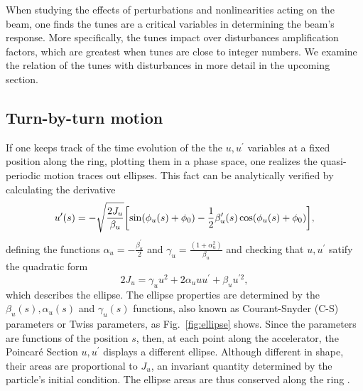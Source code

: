 When studying the effects of perturbations and nonlinearities acting on the beam, one finds the tunes are a critical variables in determining the beam's response. More specifically, the tunes impact over disturbances amplification factors, which are greatest when tunes are close to integer numbers. We examine the relation of the tunes with disturbances in more detail in the upcoming section.

\subsection{Turn-by-turn motion}
If one keeps track of the time evolution of the the $u, u^\prime$ variables at a fixed position along the ring, plotting them in a phase space, one realizes  the quasi-periodic motion traces out ellipses. This fact can be analytically verified by calculating the derivative
    \begin{equation}
        u^{\prime}(s) = - \sqrt{\frac{2J_u}{\beta_u}}\qty[\sin(\phi_u(s) + \phi_0) - \frac{1}{2}\beta_u^\prime(s)\cos(\phi_u(s) + \phi_0)],
        \label{eq:uprime}
    \end{equation}
    defining the functions $\alpha_u = -\frac{\beta_u^\prime}{2}$  and $\gamma_u = \frac{(1+\alpha_u^2)}{\beta_u}$ and checking that $u, u^\prime$ satify the quadratic form
    \begin{equation}
        2J_u=\gamma_u u^{2}+2\alpha_u u u^{\prime}+\beta_u u^{\prime2},
     \end{equation}
which describes the ellipse. The ellipse properties are determined by the $\beta_u(s), \alpha_u(s)$ and $\gamma_u(s)$ functions, also known as Courant-Snyder (C-S) parameters or Twiss parameters, as Fig.~\ref{fig:ellipse} shows. Since the parameters are functions of the position $s$, then, at each point along the accelerator, the Poincaré Section $u, u^\prime$ displays a different ellipse. Although different in shape, their areas are proportional to $J_u$, an invariant quantity determined by the particle's initial condition. The ellipse areas are thus conserved along the ring \cite{lee_accelerator_2004,wiedemann_particle_2015}.

